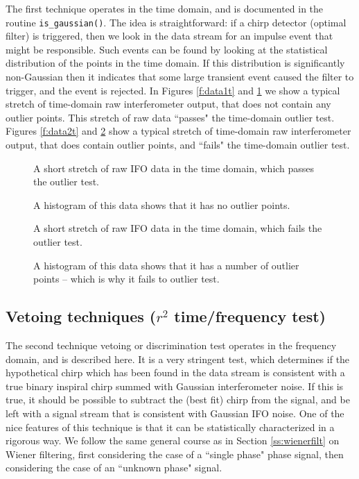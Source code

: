 The first technique operates in the time domain, and is documented in
the routine {\tt is\_gaussian()}.  The idea is straightforward: if a
chirp detector (optimal filter) is triggered, then we look in the data
stream for an impulse event that might be responsible.  Such events
can be found by looking at the statistical distribution of the points
in the time domain.  If this distribution is significantly non-Gaussian
then it indicates that some large transient event caused the filter to
trigger, and the event is rejected.  In Figures \ref{f:data1t} and \ref{f:data1h}
we show a typical stretch of time-domain raw interferometer output,
that does not contain any outlier points.  This stretch of raw data
``passes" the time-domain outlier test.  Figures \ref{f:data2t} and \ref{f:data2h}
show a typical stretch of time-domain raw interferometer output, that
does contain outlier points, and ``fails" the time-domain outlier test.
\begin{figure}
\begin{center}
\caption{
\label{f:data1t}
A short stretch of raw IFO data in the time domain, which passes the outlier
test.}
\caption{
\label{f:data1h}
A histogram of this data shows that it has no outlier points.}
\end{center}
\end{figure}
\begin{figure}
\begin{center}
\caption{
\label{f:data2t}
A short stretch of raw IFO data in the time domain, which fails the outlier
test.}
\caption{
\label{f:data2h}
A histogram of this data shows that it has a number of outlier points -- which is why
it fails to outlier test.}
\end{center}
\end{figure}
\clearpage

\subsection{Vetoing techniques ($r^2$ time/frequency test)}
\label{ss:veto}
The second technique vetoing or discrimination test operates in the
frequency domain, and is described here.  It is a very stringent test,
which determines if the hypothetical chirp which has been found in the
data stream is consistent with a true binary inspiral chirp summed with
Gaussian interferometer noise.  If this is true, it should be possible
to subtract the (best fit) chirp from the signal, and be left with
a signal stream that is consistent with Gaussian IFO noise.  One of
the nice features of this technique is that it can be statistically
characterized in a rigorous way. We follow the same general course as in
Section \ref{ss:wienerfilt} on Wiener filtering, first considering the
case of a ``single phase" phase signal, then considering the case of an
``unknown phase" signal.

